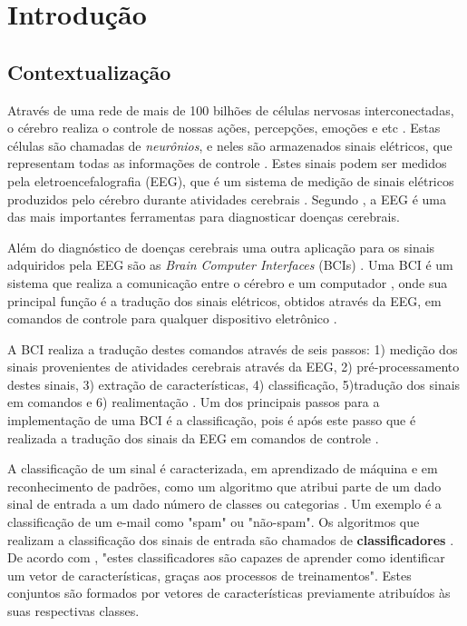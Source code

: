 \chapter[Introdução]{Introdução}

\section{Contextualização}

Através de uma rede de mais de 100 bilhões de células nervosas interconectadas, o cérebro
realiza o controle de nossas ações, percepções, emoções e etc \cite{KANDEL}. Estas células
são chamadas de \textit{neurônios}, e neles são armazenados sinais elétricos, que representam
todas as informações de controle \cite{Siulybook}. Estes sinais podem ser medidos pela
eletroencefalografia (EEG), que é um sistema de medição de sinais elétricos produzidos pelo
cérebro durante atividades cerebrais \cite{F.Lotte}. Segundo \cite{SIULYDissertacao}, a EEG
é uma das mais importantes ferramentas para diagnosticar doenças cerebrais.

Além do diagnóstico de doenças cerebrais uma outra aplicação para os sinais adquiridos
pela EEG são as \textit{Brain Computer Interfaces} (BCIs) \cite{F.Lotte}. Uma BCI é um
sistema que realiza a comunicação entre o cérebro e um computador \cite{Siulybook}, onde
sua principal função é a tradução dos sinais elétricos, obtidos através da EEG, em comandos
de controle para qualquer dispositivo eletrônico \cite{Siulybook}.

A BCI realiza a tradução destes comandos através de seis passos: 1) medição dos sinais
provenientes de atividades cerebrais através da EEG, 2) pré-processamento destes sinais,
3) extração de características, 4) classificação, 5)tradução dos sinais em comandos e 6)
realimentação \cite{MasonAndBirch}. Um dos principais passos para a implementação de uma
BCI é a classificação, pois é após este passo que é realizada a tradução dos sinais da EEG
em comandos de controle \cite{MasonAndBirch}.

A classificação de um sinal é caracterizada, em aprendizado de máquina e em reconhecimento de
padrões, como um algoritmo que atribui parte de um dado sinal de entrada a um dado número de
classes ou categorias \cite{brunelli2009template}. Um exemplo é a classificação de um e-mail
como "spam" ou "não-spam". Os algoritmos que realizam a classificação dos sinais de entrada são
chamados de \textbf{classificadores} \cite{Siulybook}. De acordo com \cite{lottephd}, "estes
classificadores são capazes de aprender como identificar um vetor de características, graças
aos processos de treinamentos". Estes conjuntos são formados por vetores de características
previamente atribuídos às suas respectivas classes.

